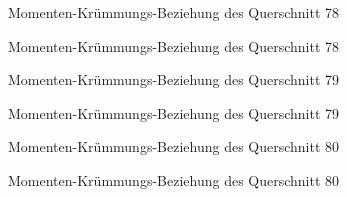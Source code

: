 \documentclass[
  11pt,
  letterpaper,
]{scrreprt}
\begin{document}
\begin{figure}[H]


\caption{\label{fig-qs_78}Momenten-Krümmungs-Beziehung des Querschnitt
78}

\end{figure}%

\begin{figure}[H]


\caption{\label{fig-m_chi_78}Momenten-Krümmungs-Beziehung des
Querschnitt 78}

\end{figure}%

\begin{figure}[H]


\caption{\label{fig-qs_79}Momenten-Krümmungs-Beziehung des Querschnitt
79}

\end{figure}%

\begin{figure}[H]


\caption{\label{fig-m_chi_79}Momenten-Krümmungs-Beziehung des
Querschnitt 79}

\end{figure}%

\begin{figure}[H]


\caption{\label{fig-qs_80}Momenten-Krümmungs-Beziehung des Querschnitt
80}

\end{figure}%

\begin{figure}[H]


\caption{\label{fig-m_chi_80}Momenten-Krümmungs-Beziehung des
Querschnitt 80}

\end{figure}%
\end{document}
